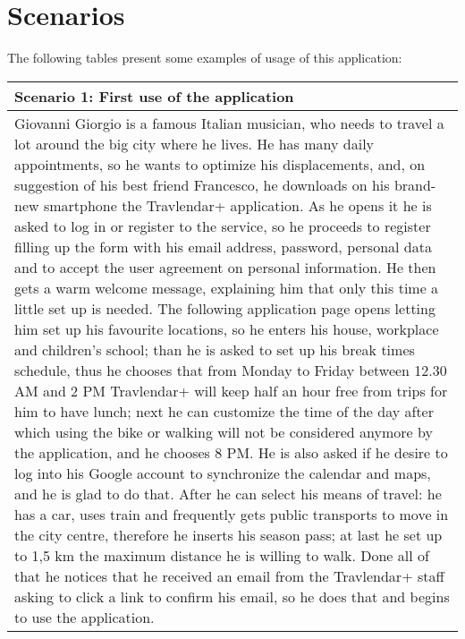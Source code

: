 %
%
\chapter{Scenarios}
%
\label{cap:scenarios}
%
%

The following tables present some examples of usage of this application:
\vspace{4mm}
%
\begin{center}
\def\arraystretch{1.13}
  \begin{tabular}{ | p{} | }
    \hline
    Scenario 1: First use of the application \\ \hline
    Giovanni Giorgio is a famous Italian musician, who needs to travel a lot around the big city where he lives. He has many daily appointments, so he wants to optimize his displacements, and, on suggestion of his best friend Francesco, he downloads on his brand-new smartphone the Travlendar+ application. As he opens it he is asked to log in or register to the service, so he proceeds to register filling up the form with his email address, password, personal data and to accept the user agreement on personal information. He then gets a warm welcome message, explaining him that only this time a little set up is needed. The following application page opens letting him set up his favourite locations, so he enters his house, workplace and children’s school; than he is asked to set up his break times schedule, thus he chooses that from Monday to Friday between 12.30 AM and 2 PM Travlendar+ will keep half an hour free from trips for him to have lunch; next he can customize the time of the day after which using the bike or walking will not be considered anymore by the application, and he chooses 8 PM. He is also asked if he desire to log into his Google account to synchronize the calendar and maps, and he is glad to do that. After he can select his means of travel: he has a car, uses train and frequently gets public transports to move in the city centre, therefore he inserts his season pass; at last he set up to 1,5 km the maximum distance he is willing to walk. Done all of that he notices that he received an email from the Travlendar+ staff asking to click a link to confirm his email, so he does that and begins to use the application. \\ \hline
  \end{tabular}
\end{center}
